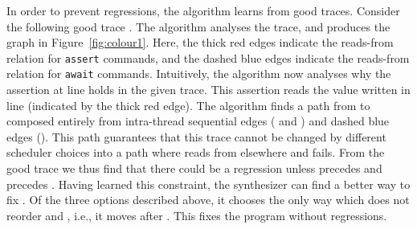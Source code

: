 \documentclass{llncs}
\begin{document}
In order to prevent regressions, the algorithm learns from good
traces. 
Consider the following good trace .
The algorithm analyses the trace, and produces the graph in 
Figure~\ref{fig:colour1}. 
Here, the thick red edges indicate the reads-from
relation for {\tt assert} commands, and the dashed blue edges indicate
the reads-from relation for {\tt await} commands. 
Intuitively, the algorithm now analyses why the assertion at line 
holds in the given trace. 
This assertion reads the value written in line  (indicated by the
thick red edge).
The algorithm finds a path from  to  composed entirely from
intra-thread sequential edges ( and ) and dashed blue
edges ().
This path guarantees that this trace cannot be changed by different
scheduler choices into a path where  reads from elsewhere and fails. 
From the good trace  we thus find that there could be a
regression unless  precedes  and  precedes . 
Having learned this constraint, the synthesizer can find a better way
to fix . 
Of the three options described above, it chooses the only way which does not
reorder  and , i.e., it moves  after . 
This fixes the program without regressions.
\end{document}
